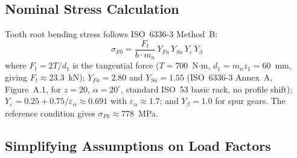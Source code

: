 \documentclass[twocolumn,12pt,a4paper]{article}
\begin{document}
\subsection{Nominal Stress Calculation}

Tooth root bending stress follows ISO~6336-3 Method~B:
\begin{equation}
\label{eq:sigma_F0}
\sigma_{F0} = \frac{F_t}{b \cdot m_n} \,
Y_{Fa} \, Y_{Sa} \, Y_\varepsilon \, Y_\beta
\end{equation}
where $F_t = 2T/d_1$ is the tangential force ($T=700$~N$\cdot$m,
$d_1 = m_n z_1 = 60$~mm, giving $F_t \approx 23.3$~kN);
$Y_{Fa}=2.80$ and $Y_{Sa}=1.55$ (ISO~6336-3 Annex~A, Figure~A.1,
for $z=20$, $\alpha=20^\circ$, standard ISO~53 basic rack, no profile
shift); $Y_\varepsilon = 0.25 + 0.75/\varepsilon_\alpha \approx 0.691$
with $\varepsilon_\alpha \approx 1.7$; and $Y_\beta = 1.0$ for spur
gears. The reference condition gives $\sigma_{F0} \approx 778$~MPa.

\subsection{Simplifying Assumptions on Load Factors}
\label{sec:load_factors}
\end{document}
